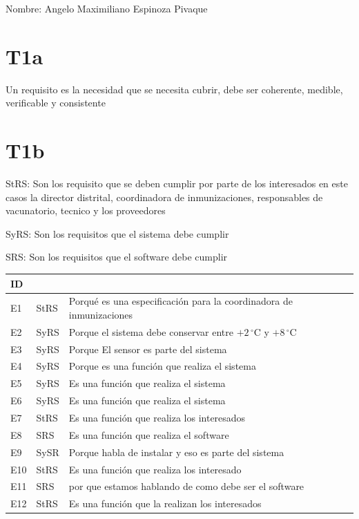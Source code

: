 \documentclass[11pt,a4paper]{article}
\begin{document}
 

Nombre: Angelo Maximiliano Espinoza Pivaque

\section*{T1a}

Un requisito es la necesidad que se necesita cubrir, debe ser
coherente, medible, verificable y consistente

\section*{T1b}

StRS: Son los requisito que se deben cumplir por parte de los
interesados en este casos la director distrital, coordinadora de
inmunizaciones, responsables de vacunatorio, tecnico y los proveedores

SyRS: Son los requisitos que el sistema debe cumplir

SRS: Son los requisitos que el software debe cumplir

\begin{longtable}{|p{1cm}|p{1.6cm}|p{11.3cm}|}
\hline
ID & & \\
\hline
E1 & StRS &
Porqué es una especificación para la coordinadora de inmunizaciones \\
\hline
E2 & SyRS &
Porque el sistema debe conservar entre $+2\,^\circ$C y $+8\,^\circ$C \\
\hline
E3 & SyRS &
Porque El sensor es parte del sistema \\
\hline
E4 & SyRS &
Porque es una función que realiza el sistema \\
\hline
E5 & SyRS &
Es una función que realiza el sistema \\
\hline
E6 & SyRS &
Es una función que realiza el sistema \\
\hline
E7 & StRS &
Es una función que realiza los interesados \\
\hline
E8 & SRS &
Es una función que realiza el software \\
\hline
E9 & SySR &
Porque habla de instalar y eso es parte del sistema \\
\hline
E10 & StRS &
Es una función que realiza los interesado \\
\hline
E11 & SRS &
por que estamos hablando de como debe ser el software \\
\hline
E12 & StRS &
Es una función que la realizan los interesados \\
\hline
\end{longtable}
\end{document}

